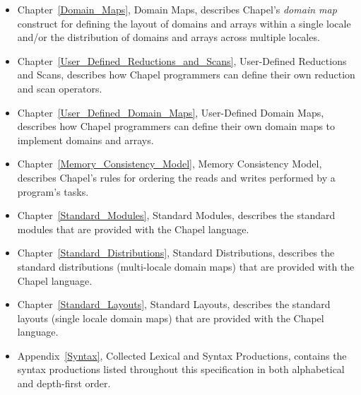 \begin{itemize}
\item
Chapter~\ref{Domain_Maps}, Domain Maps, describes
Chapel's \emph{domain map} construct for defining the layout of
domains and arrays within a single locale and/or the distribution of
domains and arrays across multiple locales.

\item
Chapter~\ref{User_Defined_Reductions_and_Scans}, User-Defined
Reductions and Scans, describes how Chapel programmers can define
their own reduction and scan operators.

\item
Chapter~\ref{User_Defined_Domain_Maps}, User-Defined Domain Maps,
describes how Chapel programmers can define their own domain maps to
implement domains and arrays.

\item
  Chapter~\ref{Memory_Consistency_Model}, Memory Consistency Model,
  describes Chapel's rules for ordering the reads and writes performed
  by a program's tasks.

\item
Chapter~\ref{Standard_Modules}, Standard Modules, describes the
standard modules that are provided with the Chapel language.

\item
Chapter~\ref{Standard_Distributions}, Standard Distributions,
describes the standard distributions (multi-locale domain maps) that
are provided with the Chapel language.

\item
Chapter~\ref{Standard_Layouts}, Standard Layouts, describes the
standard layouts (single locale domain maps) that are provided with
the Chapel language.

\item
Appendix~\ref{Syntax}, Collected Lexical and Syntax Productions,
contains the syntax productions listed throughout this specification
in both alphabetical and depth-first order.

\end{itemize}
